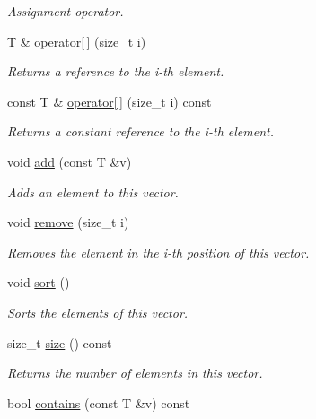 \begin{DoxyCompactItemize}
\begin{DoxyCompactList}\small\item\em Assignment operator. \end{DoxyCompactList}\item 
T \& \hyperlink{classlgraph_1_1utils_1_1svector_a6943d4e89de5500202b9b01433b0f466}{operator\mbox{[}$\,$\mbox{]}} (size\+\_\+t i)
\begin{DoxyCompactList}\small\item\em Returns a reference to the i-\/th element. \end{DoxyCompactList}\item 
const T \& \hyperlink{classlgraph_1_1utils_1_1svector_a88de6e0d075bc9a0dc3b1fed31207a43}{operator\mbox{[}$\,$\mbox{]}} (size\+\_\+t i) const 
\begin{DoxyCompactList}\small\item\em Returns a constant reference to the i-\/th element. \end{DoxyCompactList}\item 
void \hyperlink{classlgraph_1_1utils_1_1svector_a14ffd05a33eeae26ddb0909d8f64ad28}{add} (const T \&v)
\begin{DoxyCompactList}\small\item\em Adds an element to this vector. \end{DoxyCompactList}\item 
void \hyperlink{classlgraph_1_1utils_1_1svector_a9d377cbaa26f09a862334363e2d889cc}{remove} (size\+\_\+t i)
\begin{DoxyCompactList}\small\item\em Removes the element in the i-\/th position of this vector. \end{DoxyCompactList}\item 
void \hyperlink{classlgraph_1_1utils_1_1svector_ac2199e164429f7469decfa9d8f033069}{sort} ()
\begin{DoxyCompactList}\small\item\em Sorts the elements of this vector. \end{DoxyCompactList}\item 
size\+\_\+t \hyperlink{classlgraph_1_1utils_1_1svector_afa5c1579ffdd022698756ba4c142dd86}{size} () const 
\begin{DoxyCompactList}\small\item\em Returns the number of elements in this vector. \end{DoxyCompactList}\item 
bool \hyperlink{classlgraph_1_1utils_1_1svector_ab17c14abafd02d01a0e1f8230ed23680}{contains} (const T \&v) const 

\end{DoxyCompactItemize}
